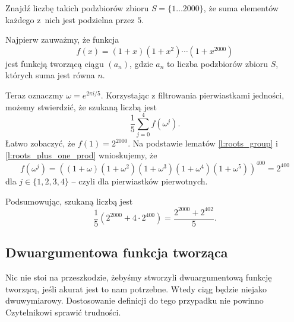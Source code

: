 \documentclass[bibliography=totocnumbered]{scrartcl}
\begin{document}
    \begin{example}
        Znajdź liczbę takich podzbiorów zbioru $S = \{1\ldots 2000\}$, że suma elementów każdego z~nich jest podzielna przez $5$.
    \end{example}
    \begin{solution}
        Najpierw zauważmy, że funkcja
        $$ f(x) = (1 + x)(1 + x^2)\cdots(1 + x^{2000}) $$
        jest funkcją tworzącą ciągu $(a_n)$, gdzie $a_n$ to liczba podzbiorów zbioru $S$, których suma jest równa $n$.

        Teraz oznaczmy $\omega = e^{2\pi i / 5}$. Korzystając z filtrowania pierwiastkami jedności, możemy stwierdzić, że szukaną liczbą jest
        $$ \frac{1}{5}\sum_{j=0}^4 f(\omega^j). $$
        Łatwo zobaczyć, że $f(1) = 2^{2000}$. Na podstawie lematów \ref{l:roots_group} i \ref{l:roots_plus_one_prod} wnioskujemy, że
        $$ f(\omega^j) = \left((1 + \omega)(1 + \omega^2)(1 + \omega^3)(1 + \omega^4)(1 + \omega^5)\right)^{400} = 2^{400} $$
        dla $j \in \{1, 2, 3, 4\}$ -- czyli dla pierwiastków pierwotnych.

        Podsumowując, szukaną liczbą jest
        $$ \frac{1}{5}\left(2^{2000} + 4\cdot 2^{400}\right) = \frac{2^{2000} + 2^{402}}{5}. $$
    \end{solution}

    \subsection{Dwuargumentowa funkcja tworząca}
    Nic nie stoi na przeszkodzie, żebyśmy stworzyli dwuargumentową funkcję tworzącą, jeśli akurat jest to nam potrzebne. Wtedy ciąg będzie niejako dwuwymiarowy. Dostosowanie definicji do tego przypadku nie powinno Czytelnikowi sprawić trudności.
\end{document}
